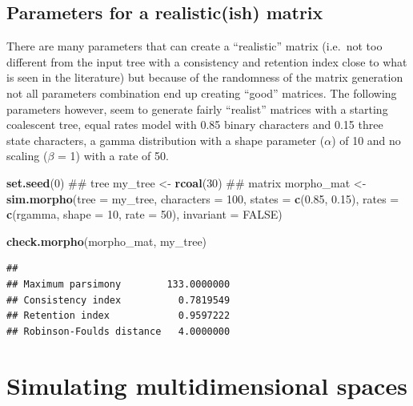 \documentclass[]{book}
\newenvironment{Shaded}{\begin{snugshade}}{\end{snugshade}}
\newcommand{\KeywordTok}[1]{\textcolor[rgb]{0.13,0.29,0.53}{\textbf{#1}}}
\newcommand{\DataTypeTok}[1]{\textcolor[rgb]{0.13,0.29,0.53}{#1}}
\newcommand{\DecValTok}[1]{\textcolor[rgb]{0.00,0.00,0.81}{#1}}
\newcommand{\FloatTok}[1]{\textcolor[rgb]{0.00,0.00,0.81}{#1}}
\newcommand{\StringTok}[1]{\textcolor[rgb]{0.31,0.60,0.02}{#1}}
\newcommand{\OtherTok}[1]{\textcolor[rgb]{0.56,0.35,0.01}{#1}}
\newcommand{\NormalTok}[1]{#1}
\theoremstyle{definition}
\theoremstyle{definition}
\theoremstyle{remark}
\begin{document}
\subsection{Parameters for a realistic(ish)
matrix}\label{parameters-for-a-realisticish-matrix}

There are many parameters that can create a ``realistic'' matrix
(i.e.~not too different from the input tree with a consistency and
retention index close to what is seen in the literature) but because of
the randomness of the matrix generation not all parameters combination
end up creating ``good'' matrices. The following parameters however,
seem to generate fairly ``realist'' matrices with a starting coalescent
tree, equal rates model with 0.85 binary characters and 0.15 three state
characters, a gamma distribution with a shape parameter (\(\alpha\)) of
10 and no scaling (\(\beta\) = 1) with a rate of 50.

\begin{Shaded}
\begin{Highlighting}[]
\KeywordTok{set.seed}\NormalTok{(}\DecValTok{0}\NormalTok{)}
\NormalTok{## tree}
\NormalTok{my_tree <-}\StringTok{ }\KeywordTok{rcoal}\NormalTok{(}\DecValTok{30}\NormalTok{)}
\NormalTok{## matrix}
\NormalTok{morpho_mat <-}\StringTok{ }\KeywordTok{sim.morpho}\NormalTok{(}\DataTypeTok{tree =}\NormalTok{ my_tree, }\DataTypeTok{characters =} \DecValTok{100}\NormalTok{, }\DataTypeTok{states =} \KeywordTok{c}\NormalTok{(}\FloatTok{0.85}\NormalTok{,}
    \FloatTok{0.15}\NormalTok{), }\DataTypeTok{rates =} \KeywordTok{c}\NormalTok{(rgamma, }\DataTypeTok{shape =} \DecValTok{10}\NormalTok{, }\DataTypeTok{rate =} \DecValTok{50}\NormalTok{), }\DataTypeTok{invariant =} \OtherTok{FALSE}\NormalTok{)}

\KeywordTok{check.morpho}\NormalTok{(morpho_mat, my_tree)}
\end{Highlighting}
\end{Shaded}

\begin{verbatim}
##                                     
## Maximum parsimony        133.0000000
## Consistency index          0.7819549
## Retention index            0.9597222
## Robinson-Foulds distance   4.0000000
\end{verbatim}

\section{Simulating multidimensional
spaces}\label{simulating-multidimensional-spaces}
\end{document}
